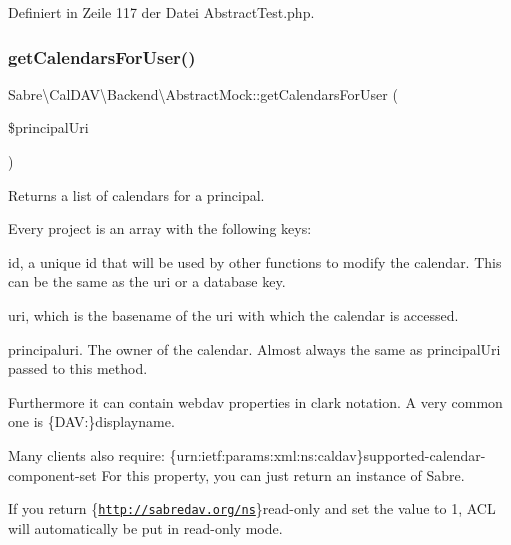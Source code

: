Definiert in Zeile 117 der Datei Abstract\+Test.\+php.

\mbox{\label{class_sabre_1_1_cal_d_a_v_1_1_backend_1_1_abstract_mock_a0393f4b2e85e510e01d8f7f7b3bc1a08}} 
\subsubsection{\texorpdfstring{get\+Calendars\+For\+User()}{getCalendarsForUser()}}
{\footnotesize\ttfamily Sabre\textbackslash{}\+Cal\+D\+A\+V\textbackslash{}\+Backend\textbackslash{}\+Abstract\+Mock\+::get\+Calendars\+For\+User (\begin{DoxyParamCaption}\item[{}]{\$principal\+Uri }\end{DoxyParamCaption})}

Returns a list of calendars for a principal.

Every project is an array with the following keys\+:
\begin{DoxyItemize}
\item id, a unique id that will be used by other functions to modify the calendar. This can be the same as the uri or a database key.
\item uri, which is the basename of the uri with which the calendar is accessed.
\item principaluri. The owner of the calendar. Almost always the same as principal\+Uri passed to this method.
\end{DoxyItemize}

Furthermore it can contain webdav properties in clark notation. A very common one is \textquotesingle{}\{D\+AV\+:\}displayname\textquotesingle{}.

Many clients also require\+: \{urn\+:ietf\+:params\+:xml\+:ns\+:caldav\}supported-\/calendar-\/component-\/set For this property, you can just return an instance of Sabre.

If you return \{\href{http://sabredav.org/ns}{\tt http\+://sabredav.\+org/ns}\}read-\/only and set the value to 1, A\+CL will automatically be put in read-\/only mode.


